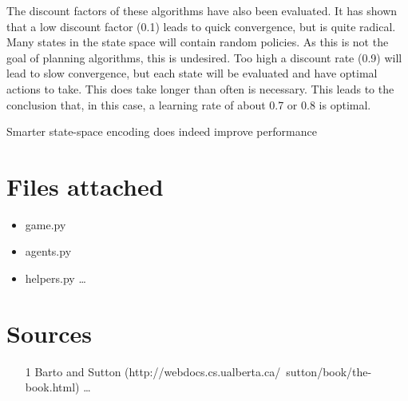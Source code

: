 \documentclass{article}
\begin{document}
The discount factors of these algorithms have also been evaluated. It has shown that a low discount factor (0.1) leads to quick convergence, but is quite radical. Many states in the state space will contain random policies. As this is not the goal of planning algorithms, this is undesired. Too high a discount rate (0.9) will lead to slow convergence, but each state will be evaluated and have optimal actions to take. This does take longer than often is necessary. This leads to the conclusion that, in this case, a learning rate of about 0.7 or 0.8 is optimal.

Smarter state-space encoding does indeed improve performance

\section*{Files attached}
\begin{itemize}
\item game.py
\item agents.py
\item helpers.py \ldots
\end{itemize}
\section*{Sources}


\begin{itemize}
	\item [1] Barto and Sutton (http://webdocs.cs.ualberta.ca/~sutton/book/the-book.html) \ldots
\end{itemize}
\end{document}
